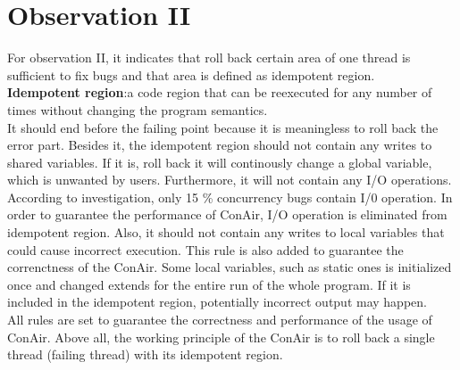 \section{Observation II}
For observation II, it indicates that roll back certain area of one thread is sufficient to fix bugs and that area is defined as idempotent region.\\
\textbf{Idempotent region}:a code region that can be reexecuted for any number of times without changing the program semantics.\\
It should end before the failing point because it is meaningless to roll back the error part. Besides it, the idempotent region should not contain any writes to shared variables. If it is, roll back it will continously change a global variable, which is unwanted by users. Furthermore, it will not contain any I/O operations. According to investigation, only 15 \% concurrency bugs contain I/0 operation. In order to guarantee the performance of ConAir, I/O operation is eliminated from idempotent region. Also, it should not contain any writes to local variables that could cause incorrect execution. This rule is also added to guarantee the correnctness of the ConAir. Some local variables, such as static ones is initialized once and changed extends for the entire run of the whole program. If it is included in the idempotent region, potentially incorrect output may happen.\\
All rules are set to guarantee the correctness and performance of the usage of ConAir. Above all, the working principle of the ConAir is to roll back a single thread (failing thread) with its idempotent region.

 